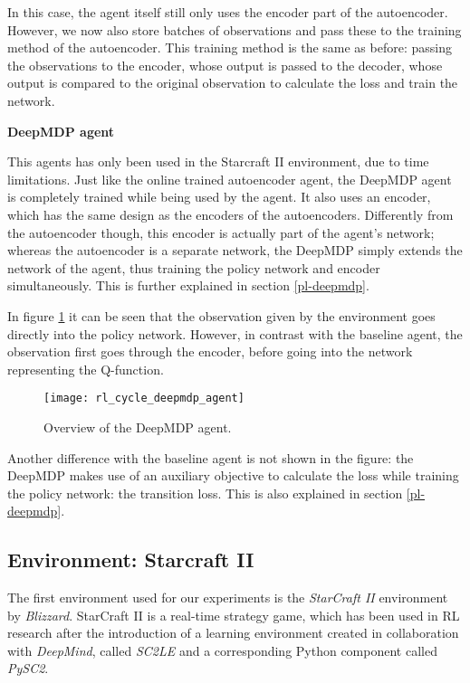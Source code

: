 In this case, the agent itself still only uses the encoder part of the autoencoder. However, we now also store batches of observations and pass these to the training method of the autoencoder. This training method is the same as before: passing the observations to the encoder, whose output is passed to the decoder, whose output is compared to the original observation to calculate the loss and train the network.\par

\noindent \textbf{DeepMDP agent}\par
\noindent This agents has only been used in the Starcraft II environment, due to time limitations. Just like the online trained autoencoder agent, the DeepMDP agent is completely trained while being used by the agent. It also uses an encoder, which has the same design as the encoders of the autoencoders. Differently from the autoencoder though, this encoder is actually part of the agent's network; whereas the autoencoder is a separate network, the DeepMDP simply extends the network of the agent, thus training the policy network and encoder simultaneously. This is further explained in section \ref{pl-deepmdp}.

In figure \ref{fig:rl_cycle_deepmdp} it can be seen that the observation given by the environment goes directly into the policy network. However, in contrast with the baseline agent, the observation first goes through the encoder, before going into the network representing the Q-function.

\begin{figure}[h]
    \centering
    \texttt{[image: rl\_cycle\_deepmdp\_agent]}
    \caption{Overview of the DeepMDP agent.}
    \label{fig:rl_cycle_deepmdp}
\end{figure}

Another difference with the baseline agent is not shown in the figure: the DeepMDP makes use of an auxiliary objective to calculate the loss while training the policy network: the transition loss. This is also explained in section \ref{pl-deepmdp}.

\subsection{Environment: Starcraft II}\label{research-env-pysc2}
The first environment used for our experiments is the \emph{StarCraft II} environment by \emph{Blizzard}\cite{blizzard}. StarCraft II is a real-time strategy game, which has been used in RL research after the introduction of a learning environment created in collaboration with \emph{DeepMind}, called \emph{SC2LE} and a corresponding Python component called \emph{PySC2}\cite{pysc2}.


